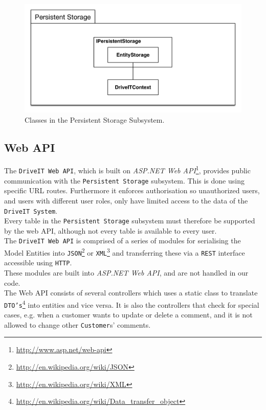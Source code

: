\begin{figure}[H]
	\centering
	\includegraphics[width=\textwidth]{Figures/EntityFrameworkSubsystemDecomposition}
	\caption{Classes in the Persistent Storage Subsystem.}
	\label{fig:entityframeworksubsystem}
\end{figure}

\subsection{Web API}
The \texttt{DriveIT Web API}, which is built on \textit{ASP.NET Web API}\footnote{\url{http://www.asp.net/web-api}}, provides public communication with the \texttt{Persistent Storage} subsystem. This is done using specific URL routes. Furthermore it enforces authorisation so unauthorized users, and users with different user roles, only have limited access to the data of the \texttt{DriveIT System}.\\ 
Every table in the \texttt{Persistent Storage} subsystem must therefore be supported by the web API, although not every table is available to every user.\\
The \texttt{DriveIT Web API} is comprised of a series of modules for serialising the Model Entities into \texttt{JSON}\footnote{\url{http://en.wikipedia.org/wiki/JSON}} or \texttt{XML}\footnote{\url{http://en.wikipedia.org/wiki/XML}} and transferring these via a \texttt{REST} interface accessible using \texttt{HTTP}.\\
These modules are built into \textit{ASP.NET Web API}, and are not handled in our code.\\

The Web API consists of several controllers which uses a static class to translate \texttt{DTO's}\footnote{\url{http://en.wikipedia.org/wiki/Data_transfer_object}} into entities and vice versa. It is also the controllers that check for special cases, e.g. when a customer wants to update or delete a comment, and it is not allowed to change other \texttt{Customer}s' comments.

